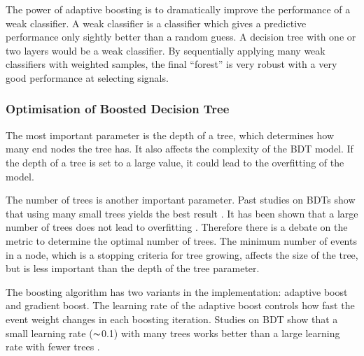 The power of  adaptive boosting  is to dramatically improve the performance of a weak classifier. A weak classifier is a classifier which gives a predictive performance only sightly better than a random guess. A decision tree with one or two layers would be a weak classifier. By sequentially applying many weak classifiers with weighted samples, the final ``forest'' is very robust with a very good performance at selecting signals.



\subsubsection{Optimisation of Boosted Decision Tree}
\label{sec:pandoraMVAbdtVar}


The most important parameter is the depth of a tree, which determines how many end nodes the tree has. It also affects the complexity of the BDT model. If the depth of a tree is set to a large value, it could lead to the overfitting of the model.

The number of trees is another important parameter. Past studies on BDTs show that using many small trees yields the best result \cite{hastie2009elements}. It has been shown that a large number of trees  does not lead to overfitting \cite{hastie2009elements}. Therefore there is a debate on the metric to determine the optimal number of trees. The minimum number of events in a node, which is a stopping criteria for tree growing, affects the size of the tree, but is less important than the depth of the tree parameter.

The boosting algorithm has two variants in the \TMVA implementation: adaptive boost and gradient boost. The learning rate of the adaptive boost  controls how fast the event weight changes in each boosting iteration. Studies on BDT show that a small learning rate ($\thicksim$0.1) with many trees works better than a large learning rate with fewer trees \cite{hastie2009elements}.

